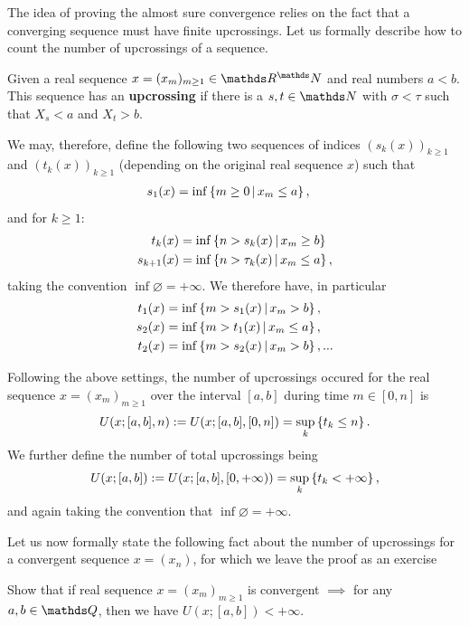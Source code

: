 The idea of proving the almost sure convergence relies on the fact that a converging sequence must have finite upcrossings. Let us formally describe how to count the number of upcrossings of a sequence.

\begin{definition}[Upcrossing]
Given a real sequence $x = (x_m)_{m\geq 1} \in \R^\N$ and real numbers $a < b$. This sequence has an \textbf{upcrossing} if there is a $s, t \in \N$ with $\sigma < \tau$ such that $X_s < a$ and $X_t > b$.
\end{definition}

We may, therefore, define the following two sequences of indices $(s_k(x))_{k\geq 1}$ and $(t_k(x))_{k\geq 1}$ (depending on the original real sequence $x$) such that
\begin{align*}
    s_1(x) &= \inf \left\{ m \geq 0 \,|\, x_m \leq a \right \},
\end{align*}
and for $k \geq 1$:
\begin{align*}
    t_k(x) &= \inf \left\{ n > s_k(x) \,|\, x_m \geq b \right \} \\
    s_{k+1}(x) &= \inf \left\{ n > \tau_k(x) \,|\, x_m \leq a \right \},
\end{align*}
taking the convention $\inf \varnothing = +\infty$. We therefore have, in particular
\begin{align*}
    t_1(x) &= \inf \left\{ m > s_1(x) \,|\, x_m > b \right \}, \\
    s_2(x) &= \inf \left\{ m > t_1(x) \,|\, x_m \leq a \right \}, \\
    t_2(x) &= \inf \left\{ m > s_2(x) \,|\, x_m > b \right \}, ...
\end{align*}

\begin{definition}
Following the above settings, the number of upcrossings occured for the real sequence $x = (x_m)_{m\geq 1}$ over the interval $[a,b]$ during time $m \in [0,n]$ is
\begin{equation}
    U(x;[a,b],n) := U(x;[a,b],[0,n]) = \sup_k \left\{ t_k \leq n \right \}. 
\end{equation}
We further define the number of total upcrossings being 
\begin{equation}
    U(x;[a,b]) := U(x;[a,b],[0,+\infty)) = \sup_k \left\{ t_k < +\infty \right \},
\end{equation}
and again taking the convention that $\inf \varnothing = +\infty$.
\end{definition}

Let us now formally state the following fact about the number of upcrossings for a convergent sequence $x = (x_n)$, for which we leave the proof as an exercise
\begin{exercise} Show that if real sequence $x = (x_m)_{m\geq 1}$ is convergent $\implies$ for any $a,b \in \Q$, then we have $U(x;[a,b]) < +\infty$.
\end{exercise}

